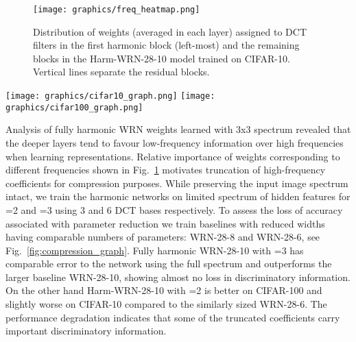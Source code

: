 \documentclass[12pt,a4paper]{article}
\begin{document}
\begin{figure}[!b]
\begin{center}
   \texttt{[image: graphics/freq\_heatmap.png]}
\end{center}
\vspace{-.25\baselineskip}
\caption{Distribution of weights (averaged in each layer) assigned to DCT filters in the first harmonic block (left-most) and the remaining blocks in the Harm-WRN-28-10 model trained on CIFAR-10. Vertical lines separate the residual blocks.}
\label{fig:freq_heatmap}
\end{figure}

\begin{figure*}[!t]
\begin{center}
   \texttt{[image: graphics/cifar10\_graph.png]}
   \texttt{[image: graphics/cifar100\_graph.png]}
\end{center}
\vspace{-1.25\baselineskip}
\caption{Decrease of classification error as a function of model size on CIFAR-10 (left) and CIFAR-100 (right). Parameters of harmonic networks are controlled by the compression parameter , the WRN baselines by the width multiplier {\it w}.}
\label{fig:compression_graph}
\end{figure*}

Analysis of fully harmonic WRN weights learned with 3x3 spectrum revealed that the deeper layers tend to favour low-frequency information over high frequencies when learning representations. Relative importance of weights corresponding to different frequencies shown in Fig.~\ref{fig:freq_heatmap} motivates truncation of high-frequency coefficients for compression purposes. While preserving the input image spectrum intact, we train the harmonic networks on limited spectrum of hidden features for =2 and =3 using 3 and 6 DCT bases respectively. 
To assess the loss of accuracy associated with parameter reduction we train baselines with reduced widths having comparable numbers of parameters: WRN-28-8 and WRN-28-6, see Fig.~\ref{fig:compression_graph}. Fully harmonic WRN-28-10 with =3 has comparable error to the network using the full spectrum and outperforms the larger baseline WRN-28-10, showing almost no loss in discriminatory information. On the other hand Harm-WRN-28-10 with =2 is better on CIFAR-100 and slightly worse on CIFAR-10 compared to the similarly sized WRN-28-6. The performance degradation indicates that some of the truncated coefficients carry important discriminatory information.
\end{document}
